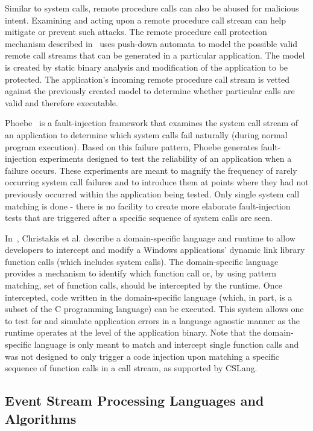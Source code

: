 Similar to system calls, remote procedure calls can also be abused for malicious intent.
Examining and acting upon a remote procedure call stream can help mitigate or prevent such attacks.
The remote procedure call protection mechanism described in~\cite{DBLP:conf/uss/GiffinJM02} uses push-down automata to model the possible valid remote call streams that can be generated in a particular application.
The model is created by static binary analysis and modification of the application to be protected.
The application's incoming remote procedure call stream is vetted against the previously created model to determine whether particular calls are valid and therefore executable.

Phoebe~\cite{DBLP:journals/corr/abs-2006-04444} is a fault-injection framework that examines
the system call stream of an application to determine which system calls fail
naturally (during normal program execution). Based on this failure pattern,
Phoebe generates fault-injection experiments designed to test the reliability of
an application when a failure occurs. These experiments are meant to magnify the
frequency of rarely occurring system call failures and to introduce them at
points where they had not previously occurred within the application being
tested. Only single system call matching is done - there is no facility to create
more elaborate fault-injection tests that are triggered after a specific
sequence of system calls are seen.

In~\cite{DBLP:conf/icse/ChristakisEG017}, Christakis et al. describe a domain-specific language and runtime to allow developers to intercept and modify a Windows applications’ dynamic link library function calls (which includes system calls). The domain-specific language provides a mechanism to identify which function call or, by using pattern matching, set of function calls, should be intercepted by the runtime. Once intercepted, code written in the domain-specific language (which, in part, is a subset of the C programming language) can be executed. This system allows one to test for and simulate application errors in a language agnostic manner as the runtime operates at the level of the application binary. Note that the domain-specific language is only meant to match and intercept single function calls and was not designed to only trigger a code injection upon matching a specific sequence of function calls in a call stream, as supported by CSLang.

\subsection{Event Stream Processing Languages and Algorithms}


